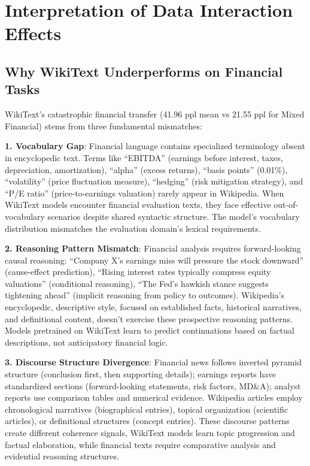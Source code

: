 \section{Interpretation of Data Interaction Effects}

\subsection{Why WikiText Underperforms on Financial Tasks}

WikiText's catastrophic financial transfer (41.96 ppl mean vs 21.55 ppl for Mixed Financial) stems from three fundamental mismatches:

\textbf{1. Vocabulary Gap}: Financial language contains specialized terminology absent in encyclopedic text. Terms like ``EBITDA'' (earnings before interest, taxes, depreciation, amortization), ``alpha'' (excess returns), ``basis points'' (0.01\%), ``volatility'' (price fluctuation measure), ``hedging'' (risk mitigation strategy), and ``P/E ratio'' (price-to-earnings valuation) rarely appear in Wikipedia. When WikiText models encounter financial evaluation texts, they face effective out-of-vocabulary scenarios despite shared syntactic structure. The model's vocabulary distribution mismatches the evaluation domain's lexical requirements.

\textbf{2. Reasoning Pattern Mismatch}: Financial analysis requires forward-looking causal reasoning: ``Company X's earnings miss will pressure the stock downward'' (cause-effect prediction), ``Rising interest rates typically compress equity valuations'' (conditional reasoning), ``The Fed's hawkish stance suggests tightening ahead'' (implicit reasoning from policy to outcomes). Wikipedia's encyclopedic, descriptive style, focused on established facts, historical narratives, and definitional content, doesn't exercise these prospective reasoning patterns. Models pretrained on WikiText learn to predict continuations based on factual descriptions, not anticipatory financial logic.

\textbf{3. Discourse Structure Divergence}: Financial news follows inverted pyramid structure (conclusion first, then supporting details); earnings reports have standardized sections (forward-looking statements, risk factors, MD\&A); analyst reports use comparison tables and numerical evidence. Wikipedia articles employ chronological narratives (biographical entries), topical organization (scientific articles), or definitional structures (concept entries). These discourse patterns create different coherence signals, WikiText models learn topic progression and factual elaboration, while financial texts require comparative analysis and evidential reasoning structures.

